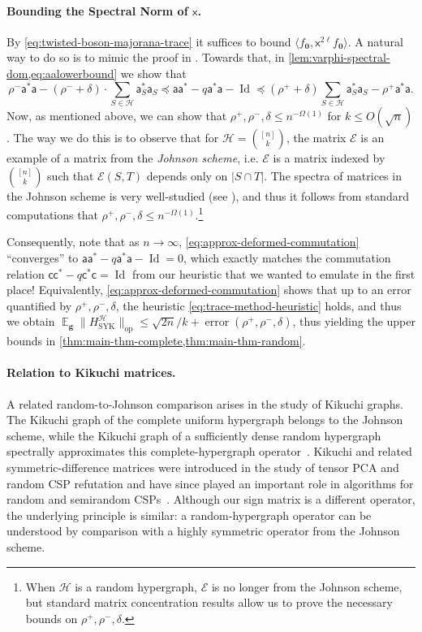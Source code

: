 \documentclass
[11pt,letterpaper]
{article}
\theoremstyle{definition}
\newcommand{\sfc}{\mathsf c}
\newcommand{\sfa}{\mathsf a}
\newcommand{\sfx}{\mathsf x}
\newcommand{\cE}{{\mathcal E}}
\newcommand{\1}{\mathbf{1}}
\newcommand{\cH}{\mathcal H}
\newcommand{\Id}{\operatorname{Id}}
\DeclareMathOperator*{\E}{\mathbb{E}}
\renewcommand{\leq}{\leqslant}
\renewcommand{\preceq}{\preccurlyeq}
\begin{document}
\paragraph{Bounding the Spectral Norm of $\sfx$.} By \cref{eq:twisted-boson-majorana-trace} it suffices to bound $\langle f_{\bm 0}, \sfx^{2\ell} f_{\bm 0}\rangle$. A natural way to do so is to mimic the proof in \cite{SYK_Berkooz3}. Towards that, in \cref{lem:varphi-spectral-dom,eq:aalowerbound} we show that 
\begin{equation}\label{eq:approx-deformed-commutation}
    \rho^-\sfa^*\sfa - (\rho^- + \delta)\cdot\sum_{S\in\cH}\sfa^*_S\sfa_S\preceq\sfa\sfa^* - q\sfa^*\sfa - \Id\preceq(\rho^+ + \delta)\sum_{S\in\cH}\sfa^*_S\sfa_S - \rho^+\sfa^*\sfa.
\end{equation}
Now, as mentioned above, we can show that $\rho^+, \rho^-, \delta\leq n^{-\Omega(1)}$ for $k\leq O(\sqrt{n})$. The way we do this is to observe that for $\cH = \binom{[n]}{k}$, the matrix $\cE$ is an example of a matrix from the \emph{Johnson scheme}, i.e. $\cE$ is a matrix indexed by $\binom{[n]}{k}$ such that $\cE(S, T)$ depends only on $|S\cap T|$. The spectra of matrices in the Johnson scheme is very well-studied (see \cite{delsarte1973algebraic,Godsil10,godsil2015erdos,Filmus16}), and thus it follows from standard computations that $\rho^+, \rho^-, \delta\leq n^{-\Omega(1)}$.\footnote{When $\cH$ is a random hypergraph, $\cE$ is no longer from the Johnson scheme, but standard matrix concentration results allow us to prove the necessary bounds on $\rho^+, \rho^-, \delta$.}

Consequently, note that as $n\to\infty$, \eqref{eq:approx-deformed-commutation} ``converges'' to $\sfa\sfa^* - q\sfa^*\sfa - \Id = 0$, which exactly matches the commutation relation $\sfc\sfc^* - q\sfc^*\sfc = \Id$ from our heuristic that we wanted to emulate in the first place! Equivalently, \eqref{eq:approx-deformed-commutation} shows that up to an error quantified by $\rho^+, \rho^-, \delta$, the heuristic \cref{eq:trace-method-heuristic} holds, and thus we obtain $\E_{\bm g}\|H^\cH_{\operatorname{SYK}}\|_{\operatorname{op}}\leq\sqrt{2n}/k + \operatorname{error}(\rho^+, \rho^-, \delta)$, thus yielding the upper bounds in \cref{thm:main-thm-complete,thm:main-thm-random}.

\paragraph{Relation to Kikuchi matrices.}
A related random-to-Johnson comparison arises in the study of Kikuchi graphs. The Kikuchi graph of the complete uniform hypergraph belongs to the Johnson scheme, while the Kikuchi graph of a sufficiently dense random hypergraph spectrally approximates this complete-hypergraph operator~\cite{Kothari25}. Kikuchi and related symmetric-difference matrices were introduced in the study of tensor PCA and random CSP refutation and have since played an important role in algorithms for random and semirandom CSPs~\cite{WeinEAM25,GuruswamiKM22,HsiehKM23,GuruswamiHKM23}. Although our sign matrix is a different operator, the underlying principle is similar: a random-hypergraph operator can be understood by comparison with a highly symmetric operator from the Johnson scheme.
\end{document}
